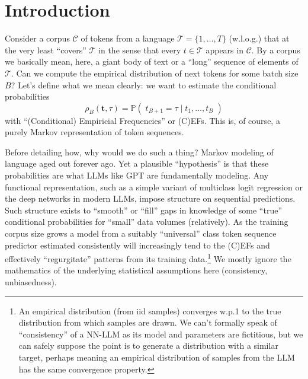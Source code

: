 \documentclass[11pt, oneside]{amsart}   	%
\title{}
\author{W. Ross Morrow}
\date{}							%
\begin{document}
\maketitle

\section{Introduction}

Consider a corpus $\mathcal{C}$ of tokens from a language $\mathcal{T} = \{1,\dotsc,T\}$ (w.l.o.g.) that at the very least ``covers'' $\mathcal{T}$ in the sense that every $t \in \mathcal{T}$ appears in $\mathcal{C}$. By a corpus we basically mean, here, a giant body of text or a ``long'' sequence of elements of $\mathcal{T}$. Can we compute the empirical distribution of next tokens for some batch size $B$? Let's define what we mean clearly: we want to estimate the conditional probabilities
\begin{equation*}
	\rho_B(\mathbf{t}, \tau) = \mathbb{P}(\; t_{B+1} = \tau \; | \; t_1, \dotsc , t_B \; )
\end{equation*}
with ``(Conditional) Empiricial Frequencies'' or (C)EFs. This is, of course, a purely Markov representation of token sequences. 

Before detailing how, why would we do such a thing? Markov modeling of language aged out forever ago. Yet a plausible ``hypothesis'' is that these probabilities are what LLMs like GPT are fundamentally modeling. Any functional representation, such as a simple variant of multiclass logit regression or the deep networks in modern LLMs, impose structure on sequential predictions. Such structure exists to ``smooth'' or ``fill'' gaps in knowledge of some ``true'' conditional probabilities for ``small'' data volumes (relatively). As the training corpus size grows a model from a suitably ``universal'' class token sequence predictor estimated consistently will increasingly tend to the (C)EFs and effectively ``regurgitate'' patterns from its training data.\footnote{An empirical distribution (from iid samples) converges w.p.1 to the true distribution from which samples are drawn. We can't formally speak of ``consistency'' of a NN-LLM as its model and parameters are fictitious, but we can safely suppose the point is to generate a distribution with a similar target, perhaps meaning an empirical distribution of samples from the LLM has the same convergence property.} We mostly ignore the mathematics of the underlying statistical assumptions here (consistency, unbiasedness). 
\end{document}
